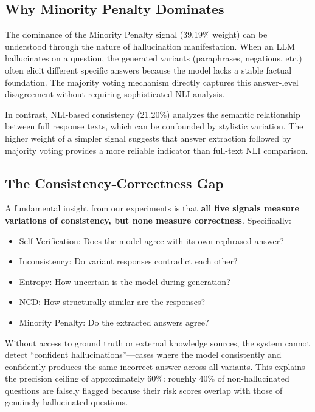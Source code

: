 \subsection{Why Minority Penalty Dominates}

The dominance of the Minority Penalty signal (39.19\% weight) can be understood through the nature of hallucination manifestation. When an LLM hallucinates on a question, the generated variants (paraphrases, negations, etc.) often elicit different specific answers because the model lacks a stable factual foundation. The majority voting mechanism directly captures this answer-level disagreement without requiring sophisticated NLI analysis.

In contrast, NLI-based consistency (21.20\%) analyzes the semantic relationship between full response texts, which can be confounded by stylistic variation. The higher weight of a simpler signal suggests that answer extraction followed by majority voting provides a more reliable indicator than full-text NLI comparison.

\subsection{The Consistency-Correctness Gap}

A fundamental insight from our experiments is that \textbf{all five signals measure variations of consistency, but none measure correctness}. Specifically:

\begin{itemize}
    \item Self-Verification: Does the model agree with its own rephrased answer?
    \item Inconsistency: Do variant responses contradict each other?
    \item Entropy: How uncertain is the model during generation?
    \item NCD: How structurally similar are the responses?
    \item Minority Penalty: Do the extracted answers agree?
\end{itemize}

Without access to ground truth or external knowledge sources, the system cannot detect ``confident hallucinations''---cases where the model consistently and confidently produces the same incorrect answer across all variants. This explains the precision ceiling of approximately 60\%: roughly 40\% of non-hallucinated questions are falsely flagged because their risk scores overlap with those of genuinely hallucinated questions.

